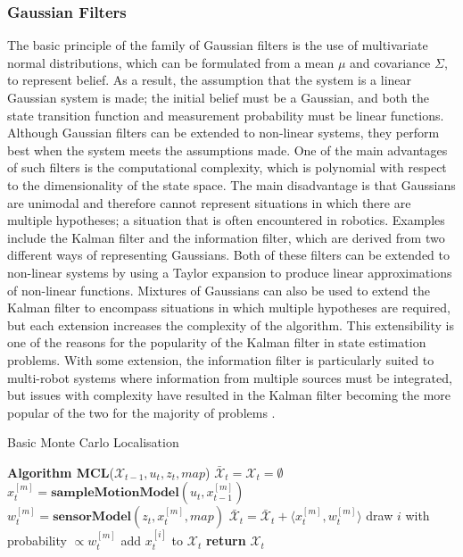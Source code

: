 \documentclass[conference]{IEEEtran}
\begin{document}
\subsubsection{Gaussian Filters}
The basic principle of the family of Gaussian filters is the use of multivariate normal distributions, which can be formulated from a mean $\mu$ and covariance $\Sigma$, to represent belief. As a result, the assumption that the system is a linear Gaussian system is made; the initial belief must be a Gaussian, and both the state transition function and measurement probability must be linear functions. Although Gaussian filters can be extended to non-linear systems, they perform best when the system meets the assumptions made. One of the main advantages of such filters is the computational complexity, which is polynomial with respect to the dimensionality of the state space. The main disadvantage is that Gaussians are unimodal and therefore cannot represent situations in which there are multiple hypotheses; a situation that is often encountered in robotics. Examples include the Kalman filter and the information filter, which are derived from two different ways of representing Gaussians. Both of these filters can be extended to non-linear systems by using a Taylor expansion to produce linear approximations of non-linear functions. Mixtures of Gaussians can also be used to extend the Kalman filter to encompass situations in which multiple hypotheses are required, but each extension increases the complexity of the algorithm. This extensibility is one of the reasons for the popularity of the Kalman filter in state estimation problems. With some extension, the information filter is particularly suited to multi-robot systems where information from multiple sources must be integrated, but issues with complexity have resulted in the Kalman filter becoming the more popular of the two for the majority of problems \cite{thrun}.

\begin{algorithm}[h]
  \caption{Basic Monte Carlo Localisation \cite{thrun}}
  \label{alg:basicMCL}
  \begin{algorithmic}[1]
    \State \textbf{Algorithm MCL}\textnormal{($\mathcal{X}_{t-1}, u_t, z_t, map$)}
    \State $\bar{\mathcal{X}}_t=\mathcal{X}_t=\emptyset$
    \State $x_t^{[m]}=\textbf{sampleMotionModel}(u_t,x_{t-1}^{[m]})$
    \State $w_t^{[m]}=\textbf{sensorModel}(z_t,x_t^{[m]},map)$
    \State $\bar{\mathcal{X}}_t=\bar{\mathcal{X}}_t+\langle x_t^{[m]},w_t^{[m]}\rangle$
    \EndFor
    \State \textnormal{draw $i$ with probability $\propto w_t^{[m]}$}
    \State \textnormal{add $x_t^{[i]}$ to $\mathcal{X}_t$}
    \EndFor
    \State \textbf{return} $\mathcal{X}_t$
  \end{algorithmic}
\end{algorithm}
\end{document}
